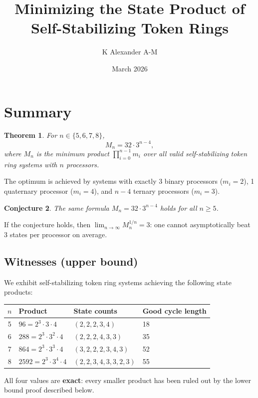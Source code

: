 \documentclass[11pt]{article}
\title{Minimizing the State Product of Self-Stabilizing Token Rings}
\author{K Alexander A-M}
\date{March 2026}
\newtheorem{theorem}{Theorem}
\newtheorem{conjecture}[theorem]{Conjecture}
\begin{document}
\maketitle

\section{Summary}

\begin{theorem}
For $n \in \{5, 6, 7, 8\}$,
\[
  M_n = 32 \cdot 3^{n-4},
\]
where $M_n$ is the minimum product $\prod_{i=0}^{n-1} m_i$ over all valid self-stabilizing token ring systems with $n$ processors.
\end{theorem}

The optimum is achieved by systems with exactly 3 binary processors ($m_i = 2$), 1 quaternary processor ($m_i = 4$), and $n-4$ ternary processors ($m_i = 3$).

\begin{conjecture}
The same formula $M_n = 32 \cdot 3^{n-4}$ holds for all $n \ge 5$.
\end{conjecture}

If the conjecture holds, then $\lim_{n\to\infty} M_n^{1/n} = 3$: one cannot asymptotically beat 3 states per processor on average.

\subsection*{Witnesses (upper bound)}

We exhibit self-stabilizing token ring systems achieving the following state products:

\begin{center}
\begin{tabular}{clll}
\toprule
$n$ & Product & State counts & Good cycle length \\
\midrule
5 & $96 = 2^3 \cdot 3 \cdot 4$ & $(2,2,2,3,4)$ & 18 \\
6 & $288 = 2^3 \cdot 3^2 \cdot 4$ & $(2,2,2,4,3,3)$ & 35 \\
7 & $864 = 2^3 \cdot 3^3 \cdot 4$ & $(3,2,2,2,3,4,3)$ & 52 \\
8 & $2592 = 2^3 \cdot 3^4 \cdot 4$ & $(2,2,3,4,3,3,2,3)$ & 55 \\
\bottomrule
\end{tabular}
\end{center}

All four values are \textbf{exact}: every smaller product has been ruled out by the lower bound proof described below.
\end{document}
